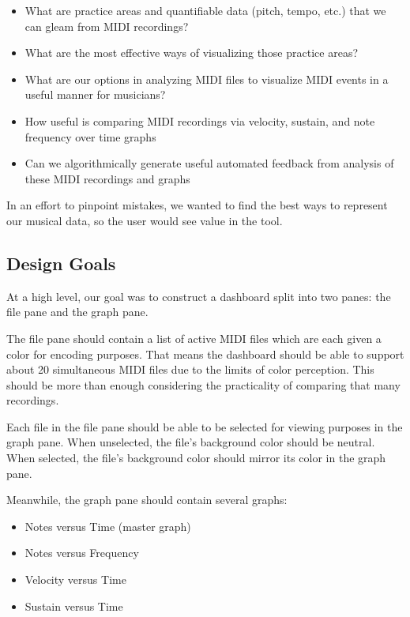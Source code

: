 \documentclass[journal]{vgtc}                %
\begin{document}
\begin{itemize}
  \item What are practice areas and quantifiable data (pitch, tempo, etc.) that
  we can gleam from MIDI recordings?
  \item What are the most effective ways of visualizing those practice areas?
  \item What are our options in analyzing MIDI files to visualize MIDI events
  in a useful manner for musicians?
  \item How useful is comparing MIDI recordings via velocity, sustain, and note
  frequency over time graphs
  \item Can we algorithmically generate useful automated feedback from analysis
  of these MIDI recordings and graphs
\end{itemize}

In an effort to pinpoint mistakes, we wanted to find the best ways to
represent our musical data, so the user would see value in the tool.

\subsection{Design Goals}

At a high level, our goal was to construct a dashboard split into two panes: the
file pane and the graph pane.

The file pane should contain a list of active MIDI files which are each given a
color for encoding purposes. That means the dashboard should be able to support
about 20 simultaneous MIDI files due to the limits of color perception. This
should be more than enough considering the practicality of comparing that many
recordings.

Each file in the file pane should be able to be selected for viewing purposes
in the graph pane. When unselected, the file's background color should be neutral.
When selected, the file's background color should mirror its color in the graph
pane.

Meanwhile, the graph pane should contain several graphs:

\begin{itemize}
  \item Notes versus Time (master graph)
  \item Notes versus Frequency
  \item Velocity versus Time
  \item Sustain versus Time
\end{itemize}
\end{document}
